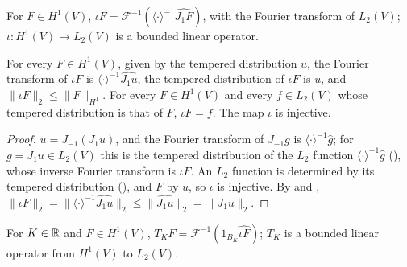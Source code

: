 \begin{definition}
\label{def:sobolev-one-to-l2}
\leanok
{}
For $F \in H^1(V)$, $\iota F = \mathcal F^{-1}(\langle \cdot \rangle^{-1} \widehat{J_1 F})$,
with the Fourier transform of $L_2(V)$; $\iota : H^1(V) \to L_2(V)$ is a bounded linear operator.
\end{definition}

\begin{lemma}
\label{lem:sobolev-one-to-l2}
\leanok
{}
For every $F \in H^1(V)$, given by the tempered distribution $u$, the Fourier transform of
$\iota F$ is $\langle \cdot \rangle^{-1} \widehat{J_1 u}$, the tempered distribution of $\iota F$
is $u$, and $\|\iota F\|_2 \leq \|F\|_{H^1}$. For every $F \in H^1(V)$ and every $f \in L_2(V)$
whose tempered distribution is that of $F$, $\iota F = f$. The map $\iota$ is injective.
\end{lemma}

\begin{proof}
\leanok
$u = J_{-1}(J_1 u)$, and the Fourier transform of $J_{-1} g$ is $\langle \cdot \rangle^{-1}
\widehat g$; for $g = J_1 u \in L_2(V)$ this is the tempered distribution of the $L_2$ function
$\langle \cdot \rangle^{-1} \widehat g$ (), whose inverse Fourier
transform is $\iota F$. An $L_2$ function is determined by its tempered distribution
(), and $F$ by $u$, so $\iota$ is injective. By
 and
,
$\|\iota F\|_2 = \|\langle \cdot \rangle^{-1} \widehat{J_1 u}\|_2 \leq \|\widehat{J_1 u}\|_2
= \|J_1 u\|_2$.
\end{proof}

\begin{definition}
\label{def:frequency-truncation}
\leanok
{}
For $K \in \mathbb{R}$ and $F \in H^1(V)$, $T_K F = \mathcal F^{-1}(1_{B_K} \widehat{\iota F})$; $T_K$
is a bounded linear operator from $H^1(V)$ to $L_2(V)$.
\end{definition}

